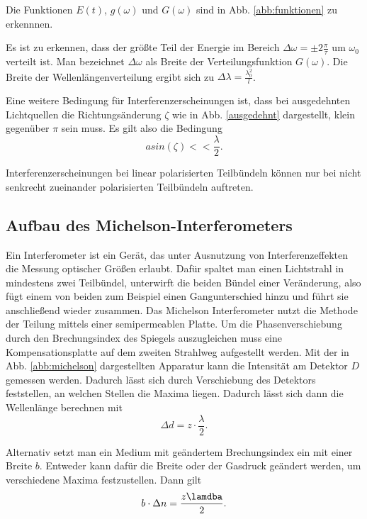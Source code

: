 Die Funktionen $E(t)$, $g(\omega)$ und $G(\omega)$ sind in Abb. \ref{abb:funktionen} zu 
erkennnen. 

Es ist zu erkennen, dass der größte Teil der Energie im Bereich $\Delta \omega =\pm 2 \frac{\pi}{\tau}$ um $\omega_0$ verteilt ist. Man bezeichnet $\Delta \omega$ als Breite der Verteilungsfunktion $G(\omega)$. Die Breite der Wellenlängenverteilung ergibt sich zu $\Delta \lambda = \frac{\lambda^{2}_0}{l}$.

Eine weitere Bedingung für Interferenzerscheinungen ist, dass bei ausgedehnten 
Lichtquellen die Richtungsänderung $\zeta$ wie in Abb. \ref{ausgedehnt} dargestellt, 
klein gegenüber $\pi$ sein muss. Es gilt also die Bedingung 
\begin{equation}
    a sin(\zeta) << \frac{\lambda}{2}.
    \label{eqn:zeta}
\end{equation}

Interferenzerscheinungen bei linear polarisierten Teilbündeln
können nur bei nicht senkrecht zueinander polarisierten Teilbündeln auftreten. 

\subsection{Aufbau des Michelson-Interferometers}

Ein Interferometer ist ein Gerät, das unter Ausnutzung von Interferenzeffekten die 
Messung optischer Größen erlaubt. Dafür spaltet man einen Lichtstrahl in mindestens zwei 
Teilbündel, unterwirft die beiden Bündel einer Veränderung, also fügt einem von beiden 
zum Beispiel einen Gangunterschied hinzu und führt sie anschließend wieder zusammen. 
Das Michelson Interferometer nutzt die Methode der Teilung mittels einer semipermeablen 
Platte. 
Um die Phasenverschiebung durch den Brechungsindex des Spiegels auszugleichen muss eine 
Kompensationsplatte auf dem zweiten Strahlweg aufgestellt werden. 
Mit der in Abb. \ref{abb:michelson} dargestellten Apparatur kann die Intensität am 
Detektor $D$ gemessen werden. Dadurch lässt sich durch Verschiebung des Detektors 
feststellen, an welchen Stellen die Maxima liegen. Dadurch lässt sich dann die 
Wellenlänge berechnen mit 
\begin{equation}
    \Delta d = z \cdot \frac{\lambda}{2}.
\end{equation}

Alternativ setzt man ein Medium mit geändertem Brechungsindex ein mit einer Breite $b$. 
Entweder kann dafür die Breite oder der Gasdruck geändert werden, um verschiedene Maxima 
festzustellen. 
Dann gilt 
\begin{equation}
    b \cdot \Delta n = \frac{z \lamdba}{2}.
\end{equation}

